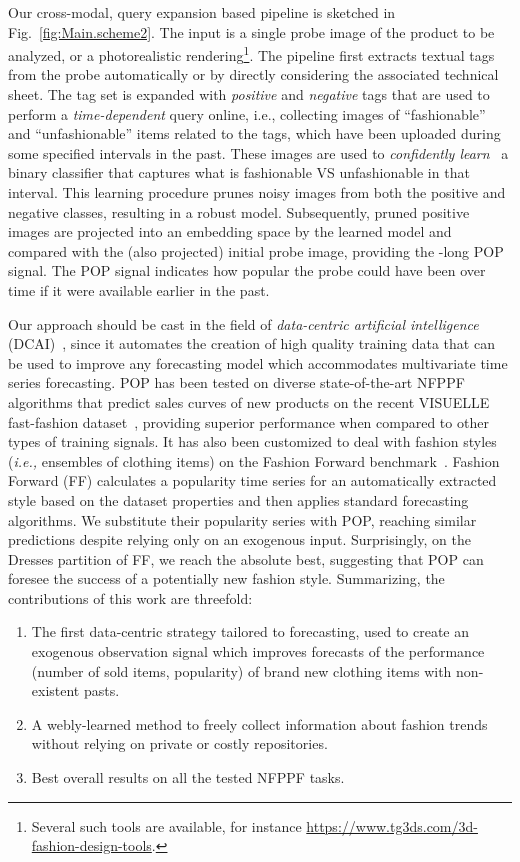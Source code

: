 \documentclass[runningheads]{llncs}
\newcommand{\snamebig}[0] {POP\xspace}
\begin{document}
Our cross-modal, query expansion based pipeline is sketched in Fig.~\ref{fig:Main.scheme2}. The input is a single probe image of the product to be analyzed, or a photorealistic rendering\footnote{Several such tools are available, for instance \url{https://www.tg3ds.com/3d-fashion-design-tools}.}. The pipeline first extracts textual tags from the probe automatically or by directly considering the associated technical sheet. The tag set is expanded with \emph{positive} and \emph{negative} tags that are used to perform a \emph{time-dependent} query online, i.e., collecting images of ``fashionable'' and ``unfashionable'' items related to the tags, which have been uploaded during some specified  intervals in the past. These images are used to \emph{confidently learn}~\cite{northcutt2021confident} a binary classifier that captures what is fashionable VS unfashionable in that interval. This learning procedure prunes noisy images from both the positive and negative classes, resulting in a robust model. Subsequently, pruned positive images are projected into an embedding space by the learned model and compared with the (also projected) initial probe image, providing the -long \snamebig signal. The \snamebig signal indicates how popular the probe could have been over time if it were available earlier in the past. 

Our approach should be cast in the field of \emph{data-centric artificial intelligence} (DCAI)~\cite{motamedi2021data}, since it automates the creation of high quality training data that can be used to improve any forecasting model which accommodates multivariate time series forecasting. \snamebig has been tested on diverse state-of-the-art NFPPF algorithms that predict sales curves of new products on the recent VISUELLE fast-fashion dataset~\cite{skenderi2021well}, providing superior performance when compared to other types of training signals. It has also been customized to deal with fashion styles (\textit{i.e.,} ensembles of clothing items) on the Fashion Forward benchmark~\cite{al2017fashion}. Fashion Forward (FF) calculates a popularity time series for an automatically extracted style based on the dataset properties and then applies standard forecasting algorithms. We substitute their popularity series with \snamebig, reaching similar predictions despite relying only on an exogenous input. Surprisingly, on the Dresses partition of FF, we reach the absolute best, suggesting that \snamebig can foresee the success of a potentially new fashion style. Summarizing, the contributions of this work are threefold:
\begin{enumerate}[noitemsep, leftmargin=*]
    \item The first data-centric strategy tailored to forecasting, used to create an exogenous observation signal which improves forecasts of the performance (number of sold items, popularity) of brand new clothing items with non-existent pasts. 
    \item A webly-learned method to freely collect information about fashion trends without relying on private or costly repositories.   
    \item Best overall results on all the tested NFPPF tasks.
\end{enumerate}
\end{document}
